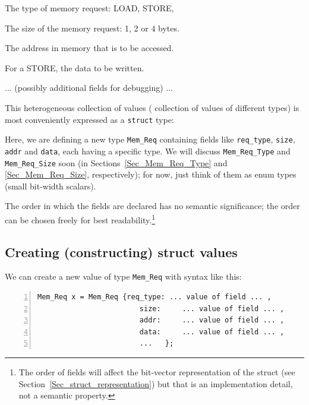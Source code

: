 \begin{tightlist}
 \item The type of memory request: LOAD, STORE, {\etc}
 \item The size of the memory request: 1, 2 or 4 bytes.
 \item The address in memory that is to be accessed.
 \item For a STORE, the data to be written.
 \item ... (possibly additional fields for debugging) ...
\end{tightlist}


This heterogeneous collection of values ({\ie} collection of values of
different types) is most conveniently expressed as a \verb|struct|
type:


Here, we are defining a new type {\tt Mem\_Req} containing fields like
{\tt req\_type}, {\tt size}, {\tt addr} and {\tt data}, each having a
specific type.  We will discuss \verb|Mem_Req_Type| and
\verb|Mem_Req_Size| soon (in Sections~\ref{Sec_Mem_Req_Type} and
\ref{Sec_Mem_Req_Size}, respectively); for now, just think of them as
enum types (small bit-width scalars).

The order in which the fields are declared has no semantic
significance; the order can be chosen freely for best
readability.\footnote{The order of fields will affect the bit-vector
representation of the struct (see
Section~\ref{Sec_struct_representation}) but that is an implementation
detail, not a semantic property.}


\subsection{Creating (constructing) struct values}


We can create a new value of type \verb|Mem_Req| with syntax like
this:

{\footnotesize
\begin{Verbatim}[frame=single, numbers=left]
   Mem_Req x = Mem_Req {req_type: ... value of field ... ,
                        size:     ... value of field ... ,
                        addr:     ... value of field ... ,
                        data:     ... value of field ... ,
                        ...   };
\end{Verbatim}
}

